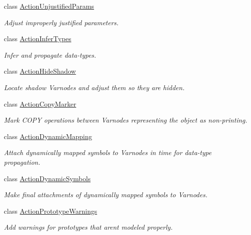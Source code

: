 \begin{DoxyCompactItemize}
class \mbox{\hyperlink{class_action_unjustified_params}{Action\+Unjustified\+Params}}
\begin{DoxyCompactList}\small\item\em Adjust improperly justified parameters. \end{DoxyCompactList}\item 
class \mbox{\hyperlink{class_action_infer_types}{Action\+Infer\+Types}}
\begin{DoxyCompactList}\small\item\em Infer and propagate data-\/types. \end{DoxyCompactList}\item 
class \mbox{\hyperlink{class_action_hide_shadow}{Action\+Hide\+Shadow}}
\begin{DoxyCompactList}\small\item\em Locate {\itshape shadow} Varnodes and adjust them so they are hidden. \end{DoxyCompactList}\item 
class \mbox{\hyperlink{class_action_copy_marker}{Action\+Copy\+Marker}}
\begin{DoxyCompactList}\small\item\em Mark C\+O\+PY operations between Varnodes representing the object as {\itshape non-\/printing}. \end{DoxyCompactList}\item 
class \mbox{\hyperlink{class_action_dynamic_mapping}{Action\+Dynamic\+Mapping}}
\begin{DoxyCompactList}\small\item\em Attach {\itshape dynamically} mapped symbols to Varnodes in time for data-\/type propagation. \end{DoxyCompactList}\item 
class \mbox{\hyperlink{class_action_dynamic_symbols}{Action\+Dynamic\+Symbols}}
\begin{DoxyCompactList}\small\item\em Make final attachments of {\itshape dynamically} mapped symbols to Varnodes. \end{DoxyCompactList}\item 
class \mbox{\hyperlink{class_action_prototype_warnings}{Action\+Prototype\+Warnings}}
\begin{DoxyCompactList}\small\item\em Add warnings for prototypes that aren\textquotesingle{}t modeled properly. \end{DoxyCompactList}\item 

\end{DoxyCompactItemize}
